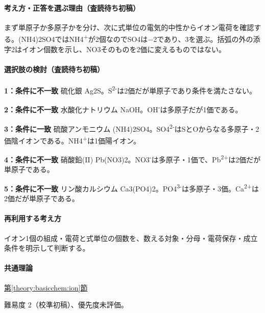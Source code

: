 \paragraph{考え方・正答を選ぶ理由（査読待ち初稿）} まず単原子か多原子かを分け、次に式単位の電気的中性からイオン電荷を確認する。(NH4)2SO4ではNH4\textsuperscript{+}が2個なのでSO4は−2であり、3を選ぶ。括弧の外の添字2はイオン個数を示し、NO3そのものを2価に変えるものではない。

\paragraph{選択肢の検討（査読待ち初稿）}\mbox{}\par

\noindent\textbf{1：条件に不一致} 硫化銀 Ag2S。S\textsuperscript{2-}は2価だが単原子であり条件を満たさない。\par

\noindent\textbf{2：条件に不一致} 水酸化ナトリウム NaOH。OH\textsuperscript{-}は多原子だが1価である。\par

\noindent\textbf{3：条件に一致} 硫酸アンモニウム (NH4)2SO4。SO4\textsuperscript{2-}はSとOからなる多原子・2価陰イオンである。NH4\textsuperscript{+}は1価陽イオン。\par

\noindent\textbf{4：条件に不一致} 硝酸鉛(II) Pb(NO3)2。NO3\textsuperscript{-}は多原子・1価で、Pb\textsuperscript{2+}は2価だが単原子である。\par

\noindent\textbf{5：条件に不一致} リン酸カルシウム Ca3(PO4)2。PO4\textsuperscript{3-}は多原子・3価。Ca\textsuperscript{2+}は2価だが単原子である。\par

\paragraph{再利用する考え方} イオン1個の組成・電荷と式単位の個数を、数える対象・分母・電荷保存・成立条件を明示して判断する。

\paragraph{共通理論} \hyperref[theory:basicchem:ion]{第\ref*{theory:basicchem:ion}節}

\par 難易度 2（校準初稿）、優先度未評価。

